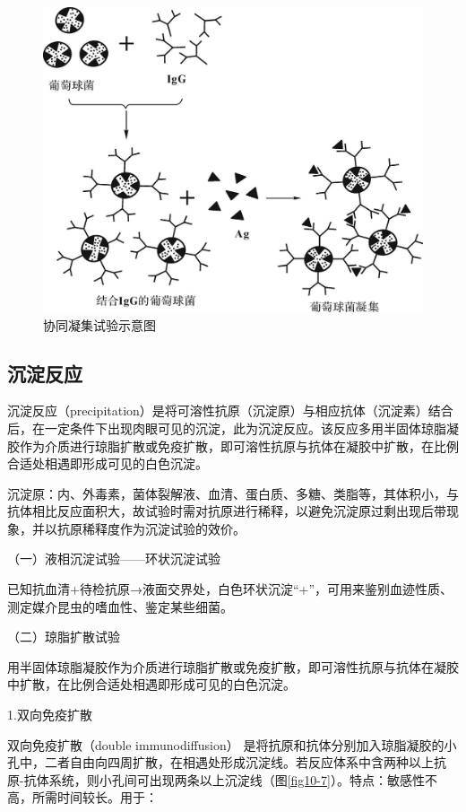 \begin{figure}[!htbp]
 \centering
 \includegraphics{./images/Image00158.jpg}
 \captionsetup{justification=centering}
 \caption{协同凝集试验示意图}
 \label{fig10-6}
  \end{figure} 


\subsection{沉淀反应}

沉淀反应（precipitation）是将可溶性抗原（沉淀原）与相应抗体（沉淀素）结合后，在一定条件下出现肉眼可见的沉淀，此为沉淀反应。该反应多用半固体琼脂凝胶作为介质进行琼脂扩散或免疫扩散，即可溶性抗原与抗体在凝胶中扩散，在比例合适处相遇即形成可见的白色沉淀。

沉淀原：内、外毒素，菌体裂解液、血清、蛋白质、多糖、类脂等，其体积小，与抗体相比反应面积大，故试验时需对抗原进行稀释，以避免沉淀原过剩出现后带现象，并以抗原稀释度作为沉淀试验的效价。

（一）液相沉淀试验------环状沉淀试验

已知抗血清+待检抗原→液面交界处，白色环状沉淀“+”，可用来鉴别血迹性质、测定媒介昆虫的嗜血性、鉴定某些细菌。

（二）琼脂扩散试验

用半固体琼脂凝胶作为介质进行琼脂扩散或免疫扩散，即可溶性抗原与抗体在凝胶中扩散，在比例合适处相遇即形成可见的白色沉淀。

1.双向免疫扩散

双向免疫扩散（double immunodiffusion）
是将抗原和抗体分别加入琼脂凝胶的小孔中，二者自由向四周扩散，在相遇处形成沉淀线。若反应体系中含两种以上抗原-抗体系统，则小孔间可出现两条以上沉淀线（图\ref{fig10-7}）。特点：敏感性不高，所需时间较长。用于：

